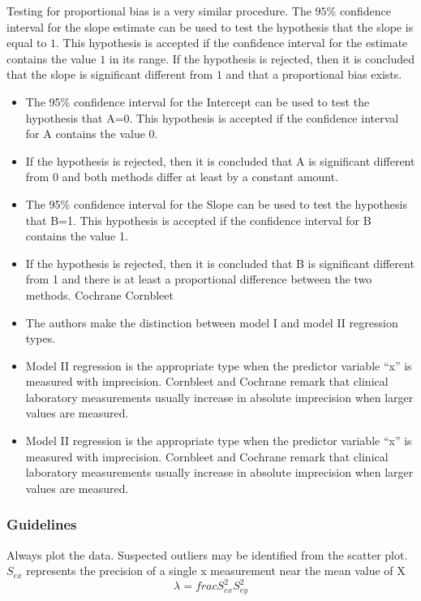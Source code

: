 \documentclass[12pt, a4paper]{report}
\theoremstyle{plain}
\theoremstyle{definition}
\theoremstyle{remark}
\begin{document}
Testing for proportional bias is a very similar procedure. The $95\%$ confidence interval for the slope estimate can be used to
test the hypothesis that the slope is equal to $1$. This hypothesis is accepted if the confidence interval for the estimate
contains the value $1$ in its range. If the hypothesis is rejected, then it is concluded that the slope is significant
different from $1$ and that a proportional bias exists.

\begin{itemize}
	
	\item The 95\% confidence interval for the Intercept can be used to test the hypothesis that A=0. This hypothesis is accepted if the confidence interval for A contains the value 0. 
	\item If the hypothesis is rejected, then it is concluded that A is significant different from 0 and both methods differ at least by a constant amount. 
	
	\item The 95\% confidence interval for the Slope can be used to test the hypothesis that B=1. This hypothesis is accepted if the confidence interval for B contains the value 1. 
	
	\item If the hypothesis is rejected, then it is concluded that B is significant different from 1 and there is at least a proportional difference between the two methods. Cochrane Cornbleet
	\item The authors make the distinction between model I and model II regression types.
	\item Model II regression is the appropriate type when the predictor variable “x” is measured with imprecision.
	Cornbleet and Cochrane remark that clinical laboratory measurements usually increase in absolute imprecision when larger values are measured. %
\end{itemize}

\begin{itemize}
\item Model II regression is the appropriate type when the predictor variable “x” is measured with imprecision.
	Cornbleet and Cochrane remark that clinical laboratory measurements usually increase in absolute imprecision when larger values are measured. %
\end{itemize}

\subsubsection*{Guidelines}
Always plot the data. Suspected outliers may be identified from the scatter plot.
$S_{ex}$  represents the precision of a single x measurement near the mean value of X
\[\lambda = frac{S^2_{ex}}{S^2_{ey}}\]
\end{document}
